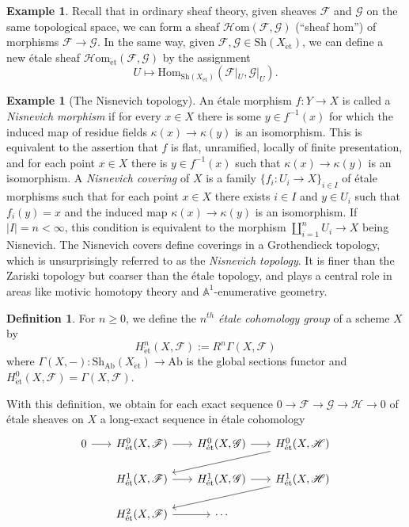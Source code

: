 \documentclass{article}
\def\~#1{\mathscr{#1}}
\numberwithin{equation}{section}
\numberwithin{figure}{section}
\newcommand{\A}{\mathbb{A}}
\newcommand{\Hom}{\mathrm{Hom}}
\newcommand{\sHom}{\~H\mathrm{om}}
\newcommand{\et}{\acute{\mathrm{e}}\mathrm{t}}
\newcommand{\Ab}{\mathrm{Ab}}
\newcommand{\Sh}{\mathrm{Sh}}
\theoremstyle{plain}
\theoremstyle{definition}
\newtheorem{defn}[thm]{Definition}
\newtheorem{ex}[thm]{Example}
\theoremstyle{remark}
\begin{document}
\begin{ex}
Recall that in ordinary sheaf theory, given sheaves $\~F$ and $\~G$ on the same topological space, we can form a sheaf $\sHom(\~F, \~G)$ (``sheaf hom'') of morphisms $\~F \to \~G$. In the same way, given $\~F, \~G \in \Sh(X_{\et})$, we can define a new \'etale sheaf $\sHom_{\et}(\~F, \~G)$ by the assignment
\[U \mapsto \Hom_{\Sh(X_{\et})}(\~F|_U, \~G|_U).\]
\end{ex}

\begin{ex}[The Nisnevich topology]
    An \'etale morphism $f: Y \to X$ is called a \emph{Nisnevich morphism} if for every $x \in X$ there is some $y \in f^{-1}(x)$ for which the induced map of residue fields $\kappa(x) \to \kappa(y)$ is an isomorphism. This is equivalent to the assertion that $f$ is flat, unramified, locally of finite presentation, and for each point $x \in X$ there is $y \in f ^{-1}(x)$ such that $\kappa(x) \to \kappa(y)$ is an isomorphism. A \emph{Nisnevich covering} of $X$ is a family $\{f_i: U_i \to X\}_{i \in I}$ of \'etale morphisms such that for each point $x \in X$ there exists $i \in I$ and $y \in U_i$ such that $f_i(y) = x$ and the induced map $\kappa(x) \to \kappa(y)$ is an isomorphism. If $|I| = n < \infty$, this condition is equivalent to the morphism $\coprod_{i=1}^n U_i \to X$ being Nisnevich. The Nisnevich covers define coverings in a Grothendieck topology, which is unsurprisingly referred to as the \emph{Nisnevich topology}. It is finer than the Zariski topology but coarser than the \'etale topology, and plays a central role in areas like motivic homotopy theory and $\A^1$-enumerative geometry.
\end{ex}

\begin{defn}
    For $n \ge 0$, we define the \emph{$n^{th}$ \'etale cohomology group} of a scheme $X$ by
    \[H^n_{\et}(X, \~F) := R^n\Gamma(X, \~F)\]
    where $\Gamma(X, -): \Sh_{\Ab}(X_{\et}) \to \Ab$ is the global sections functor and $H^0_{\et}(X, \~F) = \Gamma(X,\~F)$.
\end{defn}

With this definition, we obtain for each exact sequence $0 \to \~F \to \~G \to \~H \to 0$ of \'etale sheaves on $X$ a long-exact sequence in \'etale cohomology 
    \[\begin{tikzcd}[sep = scriptsize]
    0 &  H^0_{\et}(X, \~F) &  H^0_{\et}(X, \~G) &  H^0_{\et}(X, \~H) \\
    & { H^1_{\et}(X, \~F)} & { H^1_{\et}(X, \~G)} & { H^1_{\et}(X, \~H) } \\
    & {H^2_{\et}(X, \~F)} & \cdots
    \arrow[from=1-1, to=1-2]
    \arrow[from=1-2, to=1-3]
    \arrow[from=1-3, to=1-4]
    \arrow[from=1-4, to=2-2]
    \arrow[from=2-2, to=2-3]
    \arrow[from=2-3, to=2-4]
    \arrow[from=2-4, to=3-2]
    \arrow[from=3-2, to=3-3]
\end{tikzcd}\]
\end{document}
